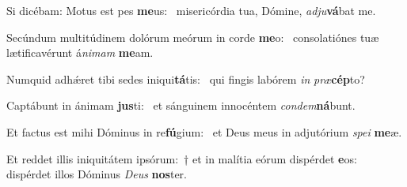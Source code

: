 \item Si dicébam: Motus est pes \textbf{me}us:~\psstar{} misericórdia tua, Dómine, \textit{adju}\textbf{vá}bat me.
\item Secúndum multitúdinem dolórum meórum in corde \textbf{me}o:~\psstar{} consolatiónes tuæ lætificavérunt á\textit{nimam} \textbf{me}am.
\item Numquid adhǽret tibi sedes iniqui\textbf{tá}tis:~\psstar{} qui fingis labórem \textit{in} \textit{præ}\textbf{cép}to?
\item Captábunt in ánimam \textbf{jus}ti:~\psstar{} et sánguinem innocéntem \textit{condem}\textbf{ná}bunt.
\item Et factus est mihi Dóminus in re\textbf{fú}gium:~\psstar{} et Deus meus in adjutórium \textit{spei} \textbf{me}æ.
\item Et reddet illis iniquitátem ipsórum:~† et in malítia eórum dispérdet \textbf{e}os:~\psstar{} dispérdet illos Dóminus \textit{Deus} \textbf{nos}ter.

